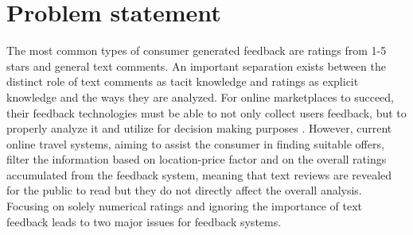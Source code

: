 \section{Problem statement}
%
The most common types of consumer generated feedback are ratings from 1-5 stars and general text comments. An important separation exists between the distinct role of text comments as tacit knowledge and ratings as explicit knowledge and the ways they are analyzed. For online marketplaces to succeed, their feedback technologies must be able to not only collect users feedback, but to properly analyze it and utilize for decision making purposes \cite{pavlou2006nature}. However, current online travel systems, aiming to assist the consumer in finding suitable offers, filter the information based on location-price factor and on the overall ratings accumulated from the feedback system, meaning that text reviews are revealed for the public to read but they do not directly affect the overall analysis. Focusing on solely numerical ratings and ignoring the importance of text feedback leads to two major issues for feedback systems. 
%
%

